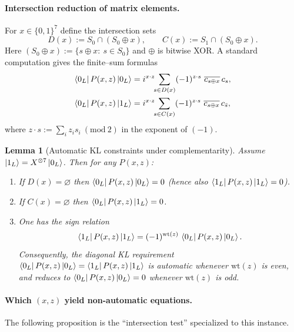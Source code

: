 \documentclass[11pt]{article}
\newtheorem{lemma}{Lemma}
\newcommand{\wt}{\mathrm{wt}}
\begin{document}
\paragraph{Intersection reduction of matrix elements.}
For $x\in\{0,1\}^7$ define the intersection sets
\[
D(x):=S_0\cap(S_0\oplus x),\qquad
C(x):=S_1\cap(S_0\oplus x).
\]
Here $(S_0\oplus x):=\{s\oplus x:\ s\in S_0\}$ and $\oplus$ is bitwise XOR.
A standard computation gives the finite--sum formulas
\begin{align}
\bra{0_L}P(x,z)\ket{0_L}
&= i^{x\cdot z}\!\!\sum_{s\in D(x)} (-1)^{z\cdot s}\ \overline{c_{s\oplus x}}\,c_s,
\label{eq:diag-sum}\\
\bra{0_L}P(x,z)\ket{1_L}
&= i^{x\cdot z}\!\!\sum_{s\in C(x)} (-1)^{z\cdot s}\ \overline{c_{s\oplus x}}\,c_{\bar s},
\label{eq:offdiag-sum}
\end{align}
where $z\cdot s:=\sum_i z_i s_i\ (\mathrm{mod}\ 2)$ in the exponent of $(-1)$.

\begin{lemma}[Automatic KL constraints under complementarity]
\label{lem:automatic-KL}
Assume $\ket{1_L}=X^{\otimes 7}\ket{0_L}$. Then for any $P(x,z)$:
\begin{enumerate}
\item If $D(x)=\varnothing$ then $\bra{0_L}P(x,z)\ket{0_L}=0$ (hence also $\bra{1_L}P(x,z)\ket{1_L}=0$).
\item If $C(x)=\varnothing$ then $\bra{0_L}P(x,z)\ket{1_L}=0$.
\item One has the sign relation
\[
\bra{1_L}P(x,z)\ket{1_L}=(-1)^{\wt(z)}\,\bra{0_L}P(x,z)\ket{0_L}.
\]
Consequently, the diagonal KL requirement
$\bra{0_L}P(x,z)\ket{0_L}=\bra{1_L}P(x,z)\ket{1_L}$
is automatic whenever $\wt(z)$ is even, and reduces to
$\bra{0_L}P(x,z)\ket{0_L}=0$ whenever $\wt(z)$ is odd.
\end{enumerate}
\end{lemma}

\paragraph{Which $(x,z)$ yield non-automatic equations.}
The following proposition is the ``intersection test'' specialized to this instance.
\end{document}
